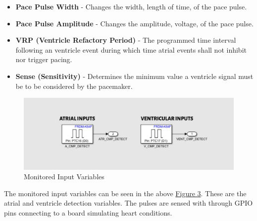 \documentclass{article}
\newcounter{subsubsubsection}[subsubsection]
\begin{document}
\begin{itemize}
    \item \textbf{Pace Pulse Width} - Changes the width, length of time, of the pace pulse.
    \item \textbf{Pace Pulse Amplitude} - Changes the amplitude, voltage, of the pace pulse.
    \item \textbf{VRP (Ventricle Refactory Period)} - The programmed time interval following an ventricle event during which time atrial
            events shall not inhibit nor trigger pacing.
    \item \textbf{Sense (Sensitivity)} - Determines the minimum value a ventricle signal must be to be considered by the pacemaker.
\end{itemize}


\begin{tcolorbox}
    \begin{figure}[H]\label{InMon}
        \includegraphics[width=\textwidth]{InMon.png}
        \caption{Monitored Input Variables}     
    \end{figure}
\end{tcolorbox}
The monitored input variables can be seen in the above \hyperref[InMon]{Figure 3}. These are the atrial and ventricle detection 
variables. The pulses are sensed with through GPIO pins connecting to a board simulating heart conditions. 
\end{document}
